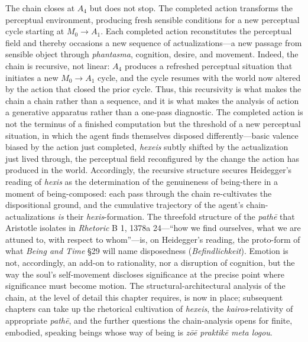 \documentclass{article}
\begin{document}
The chain closes at $A_4$ but does not stop. The completed action transforms the perceptual environment, producing fresh sensible conditions for a new perceptual cycle starting at $M_0 \rightarrow A_1$. Each completed action reconstitutes the perceptual field and thereby occasions a new sequence of actualizations---a new passage from sensible object through \textit{phantasma}, cognition, desire, and movement. Indeed, the chain is recursive, not linear: $A_4$ produces a refreshed perceptual situation that initiates a new $M_0 \rightarrow A_1$ cycle, and the cycle resumes with the world now altered by the action that closed the prior cycle. Thus, this recursivity is what makes the chain a chain rather than a sequence, and it is what makes the analysis of action a generative apparatus rather than a one-pass diagnostic. The completed action is not the terminus of a finished computation but the threshold of a new perceptual situation, in which the agent finds themselves disposed differently---basic valence biased by the action just completed, \textit{hexeis} subtly shifted by the actualization just lived through, the perceptual field reconfigured by the change the action has produced in the world. Accordingly, the recursive structure secures Heidegger's reading of \textit{hexis} as the determination of the genuineness of being-there in a moment of being-composed: each pass through the chain re-cultivates the dispositional ground, and the cumulative trajectory of the agent's chain-actualizations \textit{is} their \textit{hexis}-formation. The threefold structure of the \textit{pathē} that Aristotle isolates in \textit{Rhetoric} B 1, 1378a 24---``how we find ourselves, what we are attuned to, with respect to whom''---is, on Heidegger's reading, the proto-form of what \textit{Being and Time} §29 will name disposedness (\textit{Befindlichkeit}). Emotion is not, accordingly, an add-on to rationality, nor a disruption of cognition, but the way the soul's self-movement discloses significance at the precise point where significance must become motion. The structural-architectural analysis of the chain, at the level of detail this chapter requires, is now in place; subsequent chapters can take up the rhetorical cultivation of \textit{hexeis}, the \textit{kairos}-relativity of appropriate \textit{pathē}, and the further questions the chain-analysis opens for finite, embodied, speaking beings whose way of being is \textit{zōē praktikē meta logou}.
\end{document}
